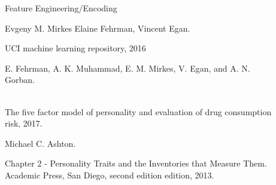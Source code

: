 \documentclass[6pt, final, xcolor=table]{beamer}
\newlength{\sepwidth}
\newlength{\colwidth}
\newcommand{\separatorcolumn}{\begin{column}{\sepwidth}\end{column}}
\begin{document}
\begin{frame}[t]
\begin{columns}[t]
\begin{column}{\colwidth}
\begin{block}{Feature Engineering/Encoding}
\begin{description}
    \small{\item [{[1]}] Evgeny M. Mirkes Elaine Fehrman, Vincent Egan.} \footnotesize{UCI machine learning repository, 2016} 
    \small{\item [{[2]}] E. Fehrman, A. K. Muhammad, E. M. Mirkes, V. Egan, and A. N. Gorban.} \\
    \footnotesize{The five factor model of personality and evaluation of drug consumption risk, 2017.}
    \small{\item [{[3]}] Michael C. Ashton.} \footnotesize{Chapter 2 - Personality Traits and the Inventories that Measure Them. \\
    Academic Press, San Diego, second edition edition, 2013.}
    
\end{description}




  \end{block}







\end{column}

\separatorcolumn

\begin{column}{\colwidth}


\end{column}
\end{columns}
\end{frame}
\end{document}
